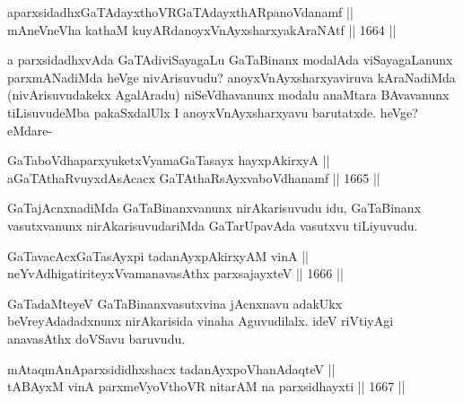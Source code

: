 
\begin{shl}
aparxsidadhxGaTAdayxthoVR\s GaTAdayxthARpanoVdanamf || \\
mAneVneVha kathaM kuyARdanoyxVnAyxsharxyakAraNAtf \hfill || 1664 ||  
\end{shl}

\begin{artha}
a parxsidadhxvAda GaTAdiviSayagaLu GaTaBinanx modalAda viSayagaLanunx parxmANadiMda heVge nivArisuvudu? anoyxVnAyxsharxyaviruva kAraNadiMda (nivArisuvudakekx AgalAradu) niSeVdhavanunx modalu anaMtara BAvavanunx tiLisuvudeMba pakaSxdalUlx I anoyxVnAyxsharxyavu barutatxde. heVge? eMdare-
\end{artha}

\begin{shl}
GaTaboVdhaparxyuketxVyamaGaTasayx hayxpAkirxyA ||  \\
aGaTAthaRvuyxdAsAcacx GaTAthaRsAyxvaboVdhanamf  \hfill || 1665 ||  
\end{shl}

\begin{artha}
GaTajAcnxnadiMda GaTaBinanxvanunx nirAkarisuvudu idu, GaTaBinanx vasutxvanunx nirAkarisuvudariMda GaTarUpavAda vasutxvu tiLiyuvudu.
\end{artha}


\begin{shl}
GaTavacAcxGaTasAyxpi tadanAyxpAkirxyAM vinA || \\
neYvAdhigatiriteyxVvamanavasAthx parxsajayxteV \hfill || 1666 || 
\end{shl}

\begin{artha}
GaTadaMteyeV GaTaBinanxvasutxvina jAcnxnavu adakUkx beVreyAdadadxnunx nirAkarisida vinaha Aguvudilalx. ideV riVtiyAgi anavasAthx doVSavu baruvudu.
\end{artha}


\begin{shl}
mAtaqmAnAparxsididhxshacx tadanAyxpoVhanAdaqteV || \\
tABAyxM vinA parxmeVyoV\s thoVR nitarAM na parxsidhayxti \hfill || 1667 ||  
\end{shl}

